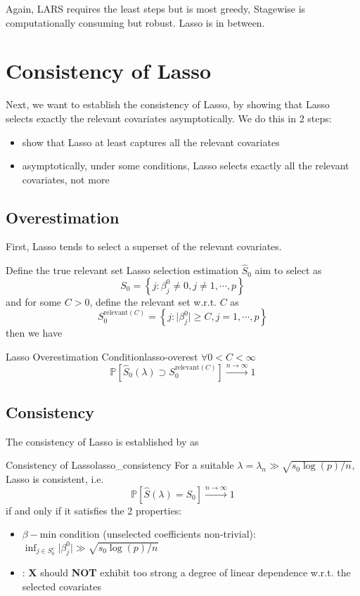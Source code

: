 \documentclass[twoside]{article}
\begin{document}
Again, LARS requires the least steps but is most greedy, Stagewise is computationally consuming but robust. Lasso is in between.

\section{Consistency of Lasso}
Next, we want to establish the consistency of Lasso, by showing that Lasso selects exactly the relevant covariates asymptotically. We do this in 2 steps:
\begin{itemize}
    \item show that Lasso at least captures all the relevant covariates
    \item asymptotically, under some conditions, Lasso selects exactly all the relevant covariates, not more
\end{itemize}

\subsection{Overestimation}
First, Lasso tends to select a superset of the relevant covariates.

Define the true relevant set Lasso selection estimation $\hat{S}_0$ aim to select as
    $$ S_0 = \left\{ j:\beta^0_j \neq 0,j \neq 1,\cdots,p \right\} $$
    and for some $C>0$, define the relevant set w.r.t. $C$ as $$ S_0^{\text{relevant}(C)} = \left\{ j: \lvert \beta^0_j \rvert \geq C, j=1,\cdots,p \right\} $$ then we have
\begin{theorem}{Lasso Overestimation Condition}{lasso-overest}
    $\forall 0<C<\infty$ $$ \mathbb{P}\left[ \hat{S}_0(\lambda) \supset S_0^{\text{relevant}(C)} \right] \xrightarrow{n\rightarrow \infty}1 $$
\end{theorem}

\subsection*{Consistency}
The consistency of Lasso is established by \citet{meinshausen2006variable} as
\begin{theorem}{Consistency of Lasso}{lasso_consistency}
    For a suitable $\lambda = \lambda_n \gg \sqrt{s_0\log(p)/n}$, Lasso is consistent, i.e. $$ \mathbb{P}\left[ \hat{S}(\lambda)=S_0 \right] \xrightarrow{n\rightarrow\infty}1 $$
    if and only if it satisfies the 2 properties:
    \begin{itemize}
        \item $\beta-$min condition (unselected coefficients non-trivial): $\inf_{j\in S^c_0}\lvert \beta^0_j \rvert \gg \sqrt{s_0 \log(p)/n}$
        \item {}: $\mathbf{X}$ should \textbf{NOT} exhibit too strong a degree of linear dependence w.r.t. the selected covariates
    \end{itemize}
\end{theorem}
\end{document}
